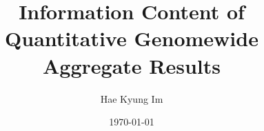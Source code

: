 \documentclass[handout]{beamer}
\title[Information Content of Quantitative GWAS results]{Information Content of Quantitative Genomewide Aggregate Results}    %
\author{Hae Kyung Im}                 %
\institute{\texttt{[image: uc-logo-maroon]}}
\date{\today}                    %
\begin{document}
\newcommand{\myfigure}[2]{

\begin{frame}
  \frametitle{#1}   %
\begin{center}
\texttt{[image: plots/\#2]} 
\end{center}
\end{frame}

}


\newcommand{\myfigura}[2]{

\begin{frame}
  \frametitle{#1}   %
\begin{center}
\texttt{[image: plots/\#2]} 
\end{center}
\end{frame}

}

\begin{frame}
  \titlepage
\end{frame}


%
%

\end{document}
